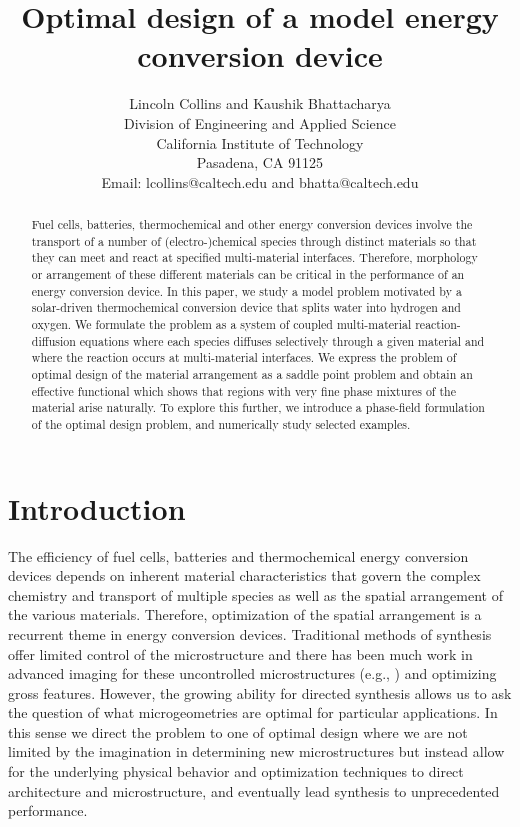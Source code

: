 \documentclass[11pt]{article}
\title{Optimal design of a model energy conversion device}
\author{Lincoln Collins and Kaushik Bhattacharya\\
\small Division of Engineering and Applied Science\\
\small California Institute of Technology\\
\small Pasadena, CA 91125\\
\small Email: lcollins@caltech.edu and bhatta@caltech.edu}
\begin{document}
\maketitle
\begin{abstract}
Fuel cells, batteries, thermochemical and other energy conversion devices involve the transport of a number of (electro-)chemical species through distinct materials so that they can meet and react at specified multi-material interfaces.  Therefore, morphology or arrangement of these different materials can be critical in the performance of an energy conversion device.  In this paper, we study a model problem motivated by a solar-driven thermochemical conversion device that splits water into hydrogen and oxygen.  We formulate the problem as a system of coupled multi-material reaction-diffusion equations where each species diffuses selectively through a given material and where the reaction occurs at multi-material interfaces.  We express the problem of optimal design of the material arrangement as a saddle point problem and obtain an effective functional which shows that regions with very fine phase mixtures of the material arise naturally.  To explore this further, we introduce a phase-field formulation of the optimal design problem, and numerically study selected examples.
\end{abstract}


\section{Introduction}
The efficiency of fuel cells, batteries and thermochemical energy conversion devices depends on inherent material characteristics that govern the complex chemistry and transport of multiple species as well as the spatial arrangement of the various materials. Therefore, optimization of the spatial arrangement is a recurrent theme in energy conversion devices.  Traditional methods of synthesis offer limited control of the microstructure and there has been much work in advanced imaging for these uncontrolled microstructures (e.g., \cite{barnett}) and optimizing gross features.  However, the growing ability for directed synthesis \cite{umeda,jung,wen,li} allows us to ask the question of what microgeometries are optimal for particular applications. In this sense we direct the problem to one of optimal design where we are not limited by the imagination in determining new microstructures but instead allow for the underlying physical behavior and optimization techniques to direct architecture and microstructure, and eventually lead synthesis to unprecedented performance. 
\end{document}
